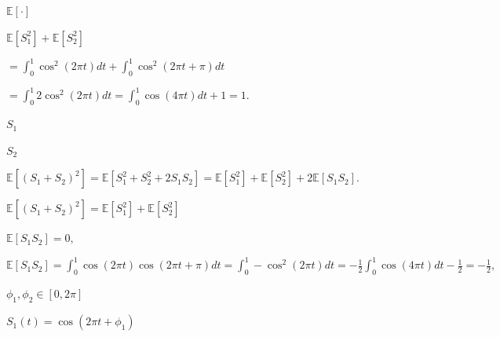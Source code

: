 \documentclass{article}
\def\lthtmlcheckvsize{\ifdim\ht\sizebox<\vsize 
  \ifdim\wd\sizebox<\hsize\expandafter\hfill\fi \expandafter\vfill
  \else\expandafter\vss\fi}%
\begin{document}
{\newpage\clearpage
{}%
$ \mathbb{E}[\cdot]$%
\lthtmlindisplaymathZ
\lthtmlcheckvsize\clearpage}

{\newpage\clearpage
{}%
$\displaystyle \mathbb{E}[S_1^2] + \mathbb{E}[S_2^2]$%
\lthtmlindisplaymathZ
\lthtmlcheckvsize\clearpage}

{\newpage\clearpage
{}%
$\displaystyle =   \int_0^1 \cos^2(2 \pi t) dt + \int_0^1 \cos^2(2 \pi  t + \pi) dt$%
\lthtmlindisplaymathZ
\lthtmlcheckvsize\clearpage}

{\newpage\clearpage
{}%
$\displaystyle = \int_0^1 2 \cos^2(2 \pi t)  dt= \int_0^1 \cos(4 \pi t)dt + 1 = 1.$%
\lthtmlindisplaymathZ
\lthtmlcheckvsize\clearpage}

{\newpage\clearpage
{}%
$ S_1$%
\lthtmlindisplaymathZ
\lthtmlcheckvsize\clearpage}

{\newpage\clearpage
{}%
$ S_2$%
\lthtmlindisplaymathZ
\lthtmlcheckvsize\clearpage}

{\newpage\clearpage
{}%
$\displaystyle \mathbb{E}[(S_1 + S_2)^2] = \mathbb{E}[S_1^2 + S_2^2 + 2 S_1 S_2]= \mathbb{E}[S_1^2] + \mathbb{E}[S_2^2] + 2 \mathbb{E}[S_1 S_2].$%
\lthtmlindisplaymathZ
\lthtmlcheckvsize\clearpage}

{\newpage\clearpage
{}%
$ \mathbb{E}[(S_1 + S_2)^2] = \mathbb{E}[S_1^2] + \mathbb{E}[S_2^2] $%
\lthtmlindisplaymathZ
\lthtmlcheckvsize\clearpage}

{\newpage\clearpage
{}%
$ \mathbb{E}[S_1 S_2] = 0,$%
\lthtmlindisplaymathZ
\lthtmlcheckvsize\clearpage}

{\newpage\clearpage
{}%
$\displaystyle \mathbb{E}[S_1S_2] = \int_0^1 \cos(2 \pi t) \cos(2 \pi t + \pi) dt =\int_0^1 -\cos^2(2 \pi t )dt = - \frac{1}{2}\int_0^1 \cos(4 \pi t)dt - \frac{1}{2} = - \frac{1}{2},
$%
\lthtmlindisplaymathZ
\lthtmlcheckvsize\clearpage}

{\newpage\clearpage
{}%
$ \phi_1,\phi_2 \in [0,2 \pi]$%
\lthtmlindisplaymathZ
\lthtmlcheckvsize\clearpage}

{\newpage\clearpage
{}%
$ S_1(t) = \cos(2 \pi t + \phi_1)$%
\lthtmlindisplaymathZ
\lthtmlcheckvsize\clearpage}
\end{document}
